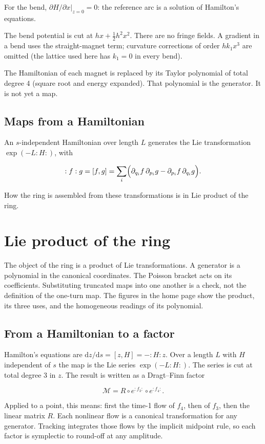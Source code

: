 \documentclass[11pt,a4paper]{article}
\begin{document}
For the bend, $\partial H/\partial x|_{z=0}=0$: the reference arc is a
solution of Hamilton's equations.

The bend potential is cut at $hx+\tfrac12 h^2 x^2$. There are no fringe
fields. A gradient in a bend uses the straight-magnet term; curvature
corrections of order $h k_1 x^3$ are omitted (the lattice used here has
$k_1=0$ in every bend).

The Hamiltonian of each magnet is replaced by its Taylor polynomial of
total degree 4 (square root and energy expanded). That polynomial is the
generator. It is not yet a map.

\subsection{Maps from a Hamiltonian}

An $s$-independent Hamiltonian over length $L$ generates the Lie
transformation $\exp(-L:H:)$, with

\[
:f:g=[f,g]=\sum_i\Bigl(\partial_{q_i}f\,\partial_{p_i}g-\partial_{p_i}f\,\partial_{q_i}g\Bigr).
\]

How the ring is assembled from these transformations is in
Lie product of the ring.
\clearpage
\section{Lie product of the ring}

The object of the ring is a product of Lie transformations. A generator is a
polynomial in the canonical coordinates. The Poisson bracket acts on its
coefficients. Substituting truncated maps into one another is a check, not
the definition of the one-turn map. The figures in the home page
show the product, its three uses, and the homogeneous readings of its
polynomial.

\subsection{From a Hamiltonian to a factor}

Hamilton's equations are $\mathrm{d}z/\mathrm{d}s=[z,H]=-:H:z$. Over a
length $L$ with $H$ independent of $s$ the map is the Lie series
$\exp(-L:H:)$. The series is cut at total degree 3 in $z$. The result is
written as a Dragt–Finn factor

\[
\mathcal{M}=R\circ e^{:f_3:}\circ e^{:f_4:}.
\]

Applied to a point, this means: first the time-1 flow of $f_4$, then of
$f_3$, then the linear matrix $R$. Each nonlinear flow is a canonical
transformation for any generator. Tracking integrates those flows by the
implicit midpoint rule, so each factor is symplectic to round-off at any
amplitude.
\end{document}
